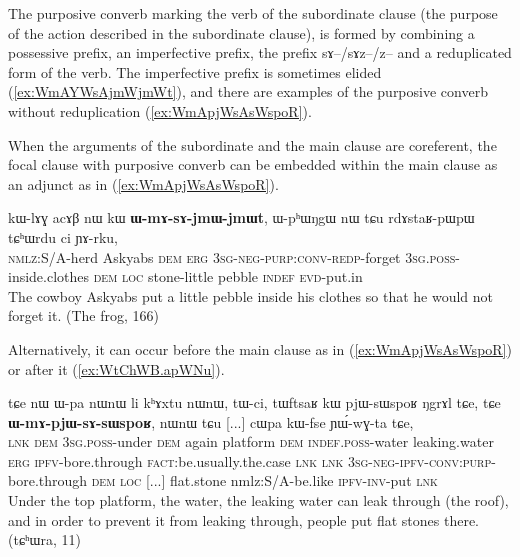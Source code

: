 \documentclass[oldfontcommands,oneside,a4paper,11pt]{article}
\newcommand{\ipa}[1]{{\phon \mbox{#1}}} %
\newcommand{\refb}[1]{(\ref{#1})}
\begin{document}
The purposive converb marking the verb of the subordinate clause (the purpose of the action described in the subordinate clause), is formed by combining a possessive prefix, an imperfective prefix, the prefix \ipa{sɤ}--/\ipa{sɤz}--/\ipa{z}-- and a reduplicated form of the verb. The imperfective prefix is sometimes elided \refb{ex:WmAYWsAjmWjmWt}, and there are examples of the purposive converb without reduplication \refb{ex:WmApjWsAsWspoR}.  

When the arguments of the subordinate and the main clause are coreferent, the focal clause with purposive converb can be embedded within the main clause as an adjunct as in \refb{ex:WmApjWsAsWspoR}.
 
\begin{exe}
\ex \label{ex:WmAYWsAjmWjmWt}
\gll
  \ipa{kɯ-lɤɣ}   	\ipa{acɤβ}   	\ipa{nɯ}   	\ipa{kɯ}   	\ipa{\textbf{ɯ-mɤ-sɤ-jmɯ-jmɯt}},   	\ipa{ɯ-pʰɯŋgɯ}   	\ipa{nɯ}   	\ipa{tɕu}   	\ipa{rdɤstaʁ-pɯpɯ}   	\ipa{tɕʰɯrdu}   	\ipa{ci}  \ipa{ɲɤ-rku,}\\
 \textsc{nmlz}:S/A-herd Askyabs \textsc{dem} \textsc{erg}  \textsc{3sg-neg-purp:conv-redp}-forget \textsc{3sg.poss}-inside.clothes \textsc{dem} \textsc{loc} stone-little pebble \textsc{indef}
 \textsc{evd}-put.in\\
\glt The cowboy Askyabs put a little pebble inside his clothes so that he would not forget it. (The frog, 166)
\end{exe}
 
Alternatively, it can occur   before the main clause as in \refb{ex:WmApjWsAsWspoR} or after it \refb{ex:WtChWB.apWNu}.

\begin{exe}
\ex \label{ex:WmApjWsAsWspoR}
\gll
\ipa{tɕe}   	\ipa{nɯ}   	\ipa{ɯ-pa}   	\ipa{nɯnɯ}   	\ipa{li}   	\ipa{kʰɤxtu}   	\ipa{nɯnɯ,}   	\ipa{tɯ-ci,}   	\ipa{tɯftsaʁ}   	\ipa{kɯ}   	\ipa{pjɯ-sɯspoʁ}   	\ipa{ŋgrɤl}   	\ipa{tɕe,}    \ipa{tɕe}   	\ipa{\textbf{ɯ-mɤ-pjɯ-sɤ-sɯspoʁ},}   	\ipa{nɯnɯ}   	\ipa{tɕu}   [...] \ipa{cɯpa}   	\ipa{kɯ-fse}   	\ipa{ɲɯ́-wɣ-ta}   	\ipa{tɕe,}   \\
\textsc{lnk} \textsc{dem} \textsc{3sg.poss}-under \textsc{dem} again platform \textsc{dem} \textsc{indef.poss}-water leaking.water \textsc{erg} \textsc{ipfv}-bore.through \textsc{fact}:be.usually.the.case \textsc{lnk} \textsc{lnk} \textsc{3sg-neg-ipfv-conv:purp}-bore.through \textsc{dem} \textsc{loc} [...] flat.stone nm\textsc{}lz:S/A-be.like \textsc{ipfv-inv}-put \textsc{lnk} \\
\glt Under the top platform, the water, the leaking water can leak through (the roof), and in order to prevent it from leaking through, people put flat stones there. (tɕʰɯra, 11)
\end{exe}
\end{document}
